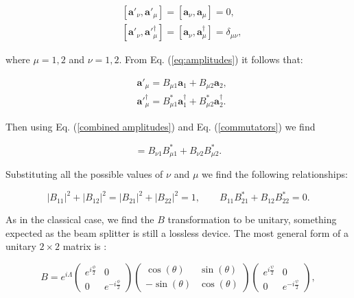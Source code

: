 \documentclass[12pt]{book}
\begin{document}
\begin{align}
&[\mathbf{a}'_{\nu},\mathbf{a}'_{\mu}]=[\mathbf{a}_{\nu},\mathbf{a}_{\mu}]=0,\\
&[\mathbf{a}'_{\nu},\mathbf{a}'^{\dagger}_{\mu}]=[\mathbf{a}_{\nu},\mathbf{a}^{\dagger}_{\mu}]=\delta_{\mu \nu},
\label{commutators}
\end{align}

where $\mu=1,2$ and $\nu=1,2$. From Eq. (\ref{eq:amplitudes}) it follows that:

\begin{align}
&\mathbf{a}'_{\mu}=B_{\mu 1}\mathbf{a}_{1}+B_{\mu 2} \mathbf{a}_{2}, \\
&\mathbf{a}'^{\dagger}_{\mu}=B_{\mu 1}^{*}\mathbf{a}^{\dagger}_{1}+B_{\mu 2}^{*} \mathbf{a}^{\dagger}_{2}.
\label{combined amplitudes}
\end{align}

Then using Eq. (\ref{combined amplitudes}) and Eq. (\ref{commutators}) we find 

\begin{equation}
   [\mathbf{a}'_{\nu},\mathbf{a}'^{\dagger}_{\mu}]=B_{\nu 1} B_{\mu 1}^{*}+B_{\nu 2} B_{\mu 2}^{*} .
\end{equation}

Substituting all the possible values of $\nu$ and $\mu$ we find the following relationships:

\begin{equation}
|B_{11}|^{2}+|B_{12}|^{2}=|B_{21}|^{2}+|B_{22}|^{2}=1 ,\qquad B_{11} B_{21}^{*}+B_{12} B_{22}^{*}=0.
\end{equation}

As in the classical case, we find the $B$ transformation to be unitary, something expected as the beam splitter is still a lossless device. The most general form of a unitary $2\times2$ matrix is \cite{leonhardt}:


\begin{equation}
B=e^{i\Lambda} \begin{pmatrix} e^{i\frac{\phi}{2}} & 0 \\ 0 & e^{-i\frac{\phi}{2}} \end{pmatrix} \begin{pmatrix} \cos(\theta) &  \sin(\theta) \\ - \sin(\theta) & \cos(\theta) \end{pmatrix} \begin{pmatrix} e^{i\frac{\psi}{2}} & 0 \\ 0 & e^{-i\frac{\psi}{2}} \end{pmatrix} \label{unitary},
\end{equation}
\end{document}
